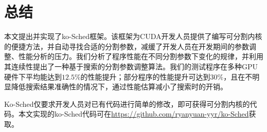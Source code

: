 \chapter{总结}

本文提出并实现了ko-Sched框架。该框架为CUDA开发人员提供了编写可分割内核的便捷方法，并自动寻找合适的分割参数，减缓了开发人员在开发期间的参数调整、性能分析的压力。我们分析了程序性能在不同分割参数下变化的规律，并利用其连续性提出了一种基于搜索的分割参数调整算法。我们的测试程序在多种GPU硬件下平均能达到$12.5\%$的性能提升；部分程序的性能提升可达到$30\%$，且在不明显降低搜索结果准确性的情况下，通过性能估算减小了搜索时的开销。

Ko-Sched仅要求开发人员对已有代码进行简单的修改，即可获得可分割内核的代码。本文实现的ko-Sched代码可在\url{https://github.com/ryanyuan-yyr/ko-Sched}获取。
